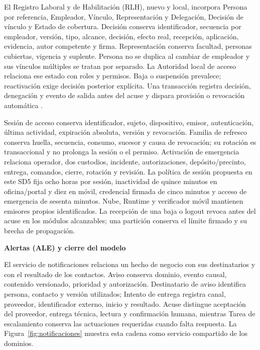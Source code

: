 El Registro Laboral y de Habilitación (RLH), nuevo y local, incorpora Persona por referencia, Empleador, Vínculo, Representación y Delegación, Decisión de vínculo y Estado de cobertura. Decisión conserva identificador, secuencia por empleador, versión, tipo, alcance, decisión, efecto real, recepción, aplicación, evidencia, autor competente y firma. Representación conserva facultad, personas cubiertas, vigencia y suplente. Persona no se duplica al cambiar de empleador y sus vínculos múltiples se tratan por separado. La Autoridad local de acceso relaciona ese estado con roles y permisos. Baja o suspensión prevalece; reactivación exige decisión posterior explícita. Una transacción registra decisión, denegación y evento de salida antes del acuse y dispara provisión o revocación automática \parencites[art.~22, p.~16]{bases-admin}[RT-12.10, p.~26]{bases-transversales}.

Sesión de acceso conserva identificador, sujeto, dispositivo, emisor, autenticación, última actividad, expiración absoluta, versión y revocación. Familia de refresco conserva huella, secuencia, consumo, sucesor y causa de revocación; su rotación es transaccional y no prolonga la sesión o el permiso. Activación de emergencia relaciona operador, dos custodios, incidente, autorizaciones, depósito/precinto, entrega, comandos, cierre, rotación y revisión. La política de sesión propuesta en este SD5 fija ocho horas por sesión, inactividad de quince minutos en oficina/portal y diez en móvil, credencial firmada de cinco minutos y acceso de emergencia de sesenta minutos. Nube, Runtime y verificador móvil mantienen emisores propios identificados. La recepción de una baja o logout revoca antes del acuse en los módulos alcanzables; una partición conserva el límite firmado y su brecha de propagación.

\medskip
\noindent\textbf{Alertas (ALE) y cierre del modelo}

El servicio de notificaciones relaciona un hecho de negocio con sus destinatarios y con el resultado de los contactos. Aviso conserva dominio, evento causal, contenido versionado, prioridad y autorización. Destinatario de aviso identifica persona, contacto y versión utilizados; Intento de entrega registra canal, proveedor, identificador externo, inicio y resultado. Acuse distingue aceptación del proveedor, entrega técnica, lectura y confirmación humana, mientras Tarea de escalamiento conserva las actuaciones requeridas cuando falta respuesta. La Figura~\ref{fig:notificaciones} muestra esta cadena como servicio compartido de los dominios.

